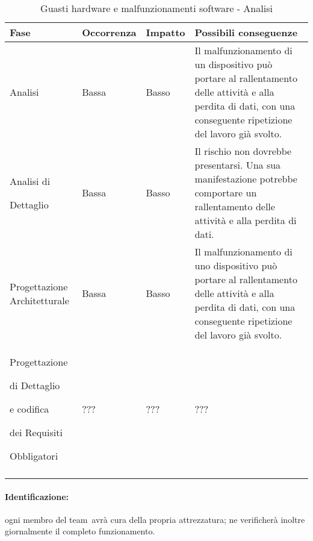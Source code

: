 \documentclass[../PianoProgetto.tex]{subfiles}
\begin{document}
	\hspace{0pt}
		\begin{longtabu} to \textwidth {X[.55] X[c .50] X[c .50] X}
			\toprule
			\textbf{Fase} & \textbf{Occorrenza} & \textbf{Impatto} & \textbf{Possibili conseguenze}\\
			\midrule
			\endhead			
			
			Analisi & Bassa & Basso & Il malfunzionamento di un dispositivo può portare al rallentamento delle attività e alla perdita di dati, con una conseguente ripetizione del lavoro già svolto. \\
			\midrule
			Analisi di \par Dettaglio & Bassa & Basso & Il rischio non dovrebbe presentarsi. Una sua manifestazione potrebbe comportare un rallentamento delle attività e alla perdita di dati. \\
			\midrule
			Progettazione Architetturale & Bassa & Basso & Il malfunzionamento di uno dispositivo può portare al rallentamento delle attività e alla perdita di dati, con una conseguente ripetizione del lavoro già svolto. \\
			\midrule
			Progettazione \par di Dettaglio \par e codifica \par dei Requisiti \par Obbligatori & ??? & ??? & ???\\
			\bottomrule
			
			\caption{Guasti hardware e malfunzionamenti software - Analisi}
			\label{tab:Guasti hardware e malfunzionamenti software - Analisi}	
		\end{longtabu}


		
	\paragraph*{Identificazione:} ogni membro del team\g\ avrà cura della propria attrezzatura; ne verificherà inoltre giornalmente il completo funzionamento.
	
\end{document}
